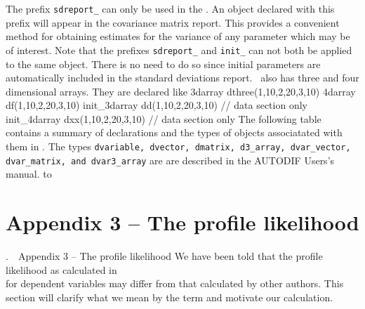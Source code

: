 \documentclass[12pt]{book}
\makeatletter
\def\mysection#1{\section{#1}{\bigbf \medbreak\noindent\number\c@chapter.\number\c@section\ \ #1\medbreak}}
\makeatother
\begin{document}
The prefix {\tt sdreport\_} can only be used in the \PS.
An object declared with this prefix will appear in the
covariance matrix report. This provides a convenient method for
obtaining estimates for the variance of any parameter
which may be of interest. Note that the prefixes
{\tt sdreport\_} and {\tt init\_} can not both be applied to the
same object. There is no need to do so since 
initial parameters are automatically included in the
standard deviations report.
\ADM\ also has three and four dimensional arrays. They are declared like
\beginexample
3darray dthree(1,10,2,20,3,10)
4darray df(1,10,2,20,3,10)
init_3darray dd(1,10,2,20,3,10)    // data section only
init_4darray dxx(1,10,2,20,3,10)   // data section only
\endexample
The following table contains a summary of declarations and the types of 
objects associatated with them in \ADM. The types {\tt dvariable,
dvector, dmatrix, d3\_array, dvar\_vector, dvar\_matrix, and dvar3\_array}
are are described in the AUTODIF Users's manual.
\htmlbegintex
{\stt
\halign to }
\htmlendtex

\mysection{Appendix 3 -- The profile likelihood}
We have been told that the profile likelihood as calculated in \ADM\\
for dependent variables may differ from that calculated by other authors.
This section will clarify what we mean by the term and motivate our
calculation.  
\end{document}
